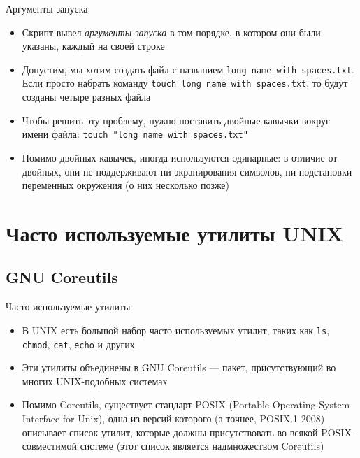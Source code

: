 \documentclass{beamer}
\begin{document}
\begin{frame}{Аргументы запуска}
	\begin{itemize}
		\item{Скрипт вывел \emph{аргументы запуска} в том порядке, в котором они были указаны, каждый на своей строке}\pause
		\item{Допустим, мы хотим создать файл с названием \texttt{long name with spaces.txt}. Если просто набрать команду \texttt{touch~long~name~with~spaces.txt}, то будут созданы четыре разных файла}\pause
		\item{Чтобы решить эту проблему, нужно поставить двойные кавычки вокруг имени файла: \texttt{touch~"long~name~with~spaces.txt"}}\pause
		\item{Помимо двойных кавычек, иногда используются одинарные: в отличие от двойных, они не поддерживают ни экранирования символов, ни подстановки переменных окружения (о них несколько позже)} 
	\end{itemize}
\end{frame}

\section{Часто используемые утилиты UNIX}

\subsection{GNU Coreutils}
\begin{frame}{Часто используемые утилиты}
	\begin{itemize}
		\item{В UNIX есть большой набор часто используемых утилит, таких как \texttt{ls}, \texttt{chmod}, \texttt{cat}, \texttt{echo} и других}\pause
		\item{Эти утилиты объединены в GNU Coreutils --- пакет, присутствующий во многих UNIX-подобных системах}\pause
		\item{Помимо Coreutils, существует стандарт POSIX (Portable Operating System Interface for Unix), одна из версий которого (а точнее, POSIX.1-2008) описывает список утилит, которые должны присутствовать во всякой POSIX-совместимой системе (этот список является надмножеством Coreutils)}
	\end{itemize}
\end{frame}
\end{document}
